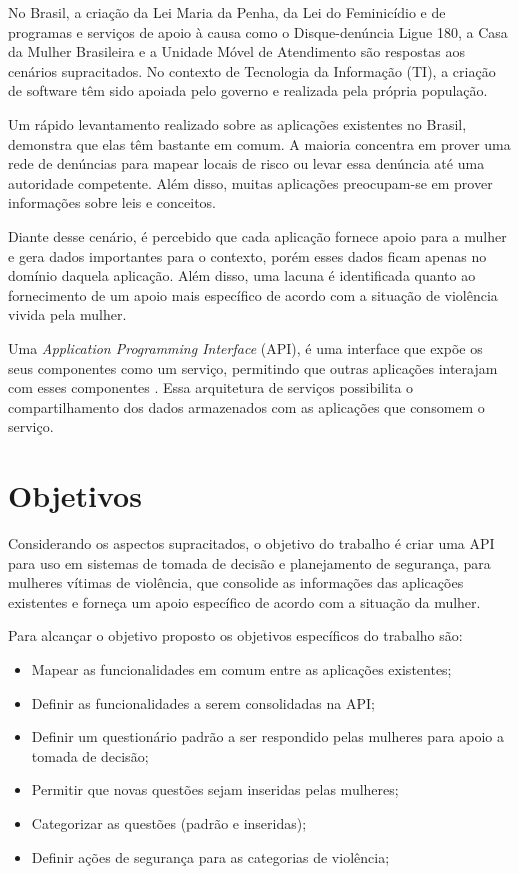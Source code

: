 No Brasil, a criação da Lei Maria da Penha, da Lei do Feminicídio e de programas e serviços de apoio à causa 
como o Disque-denúncia Ligue 180, a Casa da Mulher Brasileira e a Unidade Móvel de Atendimento são respostas aos cenários supracitados. No contexto de Tecnologia da Informação (TI), a criação de software têm sido apoiada pelo governo e realizada pela própria população.

Um rápido levantamento realizado sobre as aplicações existentes no Brasil, demonstra que elas têm bastante em comum. A maioria concentra em prover uma rede de denúncias para mapear locais de risco ou levar essa
denúncia até uma autoridade competente. Além disso, muitas aplicações preocupam-se em prover informações sobre leis e conceitos.

Diante desse cenário, é percebido que cada aplicação fornece apoio para a mulher e 
gera dados importantes para o contexto, porém esses dados ficam apenas no domínio daquela aplicação. 
Além disso, uma lacuna é identificada quanto ao fornecimento de um apoio mais específico de acordo com a situação de violência vivida pela mulher.

Uma \textit{Application Programming Interface} (API), é uma interface que expõe os seus componentes como um serviço, permitindo que outras aplicações interajam com esses componentes \cite{wagh2012comparative, understanding_web}. Essa arquitetura de serviços possibilita o compartilhamento dos dados armazenados com as aplicações que consomem o serviço. 

\section{Objetivos}

Considerando os aspectos supracitados, o objetivo do trabalho é criar uma API para uso em sistemas de tomada de decisão e planejamento de segurança, para mulheres vítimas de violência, que consolide as informações das aplicações existentes e forneça um apoio específico de acordo com a situação da mulher.

Para alcançar o objetivo proposto os objetivos específicos do trabalho são:
\begin{itemize}
	\item Mapear as funcionalidades em comum entre as aplicações existentes;
	\item Definir as funcionalidades a serem consolidadas na API;
	\item Definir um questionário padrão a ser respondido pelas mulheres para apoio a tomada de decisão;
	\item Permitir que novas questões sejam inseridas pelas mulheres;
	\item Categorizar as questões (padrão e inseridas);
	\item Definir ações de segurança para as categorias de violência;
\end{itemize}

